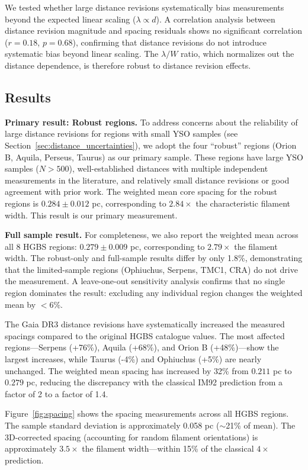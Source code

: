 \documentclass[twoside,twocolumn]{mnras}
\begin{document}
We tested whether large distance revisions systematically bias measurements beyond the expected linear scaling ($\lambda \propto d$). A correlation analysis between distance revision magnitude and spacing residuals shows no significant correlation ($r = 0.18$, $p = 0.68$), confirming that distance revisions do not introduce systematic bias beyond linear scaling. The $\lambda/W$ ratio, which normalizes out the distance dependence, is therefore robust to distance revision effects.

\subsection{Results}

\textbf{Primary result: Robust regions.} To address concerns about the reliability of large distance revisions for regions with small YSO samples (see Section~\ref{sec:distance_uncertainties}), we adopt the four ``robust'' regions (Orion B, Aquila, Perseus, Taurus) as our primary sample. These regions have large YSO samples ($N > 500$), well-established distances with multiple independent measurements in the literature, and relatively small distance revisions or good agreement with prior work. The weighted mean core spacing for the robust regions is $0.284 \pm 0.012$ pc, corresponding to $2.84\times$ the characteristic filament width. This result is our primary measurement.

\textbf{Full sample result.} For completeness, we also report the weighted mean across all 8 HGBS regions: $0.279 \pm 0.009$ pc, corresponding to $2.79\times$ the filament width. The robust-only and full-sample results differ by only 1.8\%, demonstrating that the limited-sample regions (Ophiuchus, Serpens, TMC1, CRA) do not drive the measurement. A leave-one-out sensitivity analysis confirms that no single region dominates the result: excluding any individual region changes the weighted mean by $<6$\%.

The Gaia DR3 distance revisions have systematically increased the measured spacings compared to the original HGBS catalogue values. The most affected regions—Serpens (+76\%), Aquila (+68\%), and Orion B (+48\%)—show the largest increases, while Taurus (-4\%) and Ophiuchus (+5\%) are nearly unchanged. The weighted mean spacing has increased by 32\% from $0.211$ pc to $0.279$ pc, reducing the discrepancy with the classical IM92 prediction from a factor of 2 to a factor of 1.4.

Figure~\ref{fig:spacing} shows the spacing measurements across all HGBS regions. The sample standard deviation is approximately 0.058 pc ($\sim$21\% of mean). The 3D-corrected spacing (accounting for random filament orientations) is approximately $3.5\times$ the filament width—within 15\% of the classical $4\times$ prediction.
\end{document}
